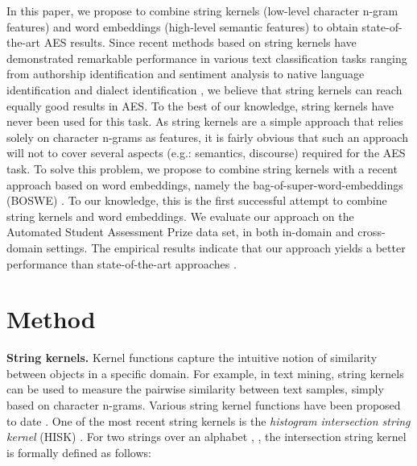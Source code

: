 \documentclass[11pt,a4paper]{article}
\begin{document}
In this paper, we propose to combine string kernels (low-level character n-gram features) and word embeddings (high-level semantic features) to obtain state-of-the-art AES results. Since recent methods based on string kernels have demonstrated remarkable performance in various text classification tasks ranging from authorship identification \cite{PopescuG12} and sentiment analysis \cite{franco-EACL-2017,marius-KES-2017} to native language identification \cite{popescu-ionescu:2013:BEA8,ionescu-popescu-cahill-EMNLP-2014,Radu-ICONIP-2015,ionescu-popescu-cahill-COLI-2016,Ionescu-BEA-2017} and dialect identification \cite{Radu-Marius-ADI-2016,Radu-Andrei-ADI-2017}, we believe that string kernels can reach equally good results in AES. To the best of our knowledge, string kernels have never been used for this task. As string kernels are a simple approach that relies solely on character n-grams as features, it is fairly obvious that such an approach will not to cover several aspects (e.g.: semantics, discourse) required for the AES task. To solve this problem, we propose to combine string kernels with a recent approach based on word embeddings, namely the bag-of-super-word-embeddings (BOSWE) \cite{Ionescu-KES-2017}. To our knowledge, this is the first successful attempt to combine string kernels and word embeddings. We evaluate our approach on the Automated Student Assessment Prize data set, in both in-domain and cross-domain settings. The empirical results indicate that our approach yields a better performance than state-of-the-art approaches \cite{Phandi-EMNLP-2015,Dong-EMNLP-2016,Dong-CONLL-2017,Tay-ACL-2018}.

\vspace*{-0.1cm} 
\section{Method}
\label{sec_String_Kernels}
\vspace*{-0.05cm} 

\noindent
{\bf String kernels.}
Kernel functions \cite{taylor-Cristianini-cup-2004} capture the intuitive notion of similarity between objects in a specific domain. For example, in text mining, string kernels can be used to measure the pairwise similarity between text samples, simply based on character n-grams. Various string kernel functions have been proposed to date \cite{LodhiSSCW02,taylor-Cristianini-cup-2004,ionescu-popescu-cahill-EMNLP-2014}. One of the most recent string kernels is the \emph{histogram intersection string kernel} (HISK) \cite{ionescu-popescu-cahill-EMNLP-2014}. For two strings over an alphabet , , the intersection string kernel is formally defined as follows:
\end{document}
